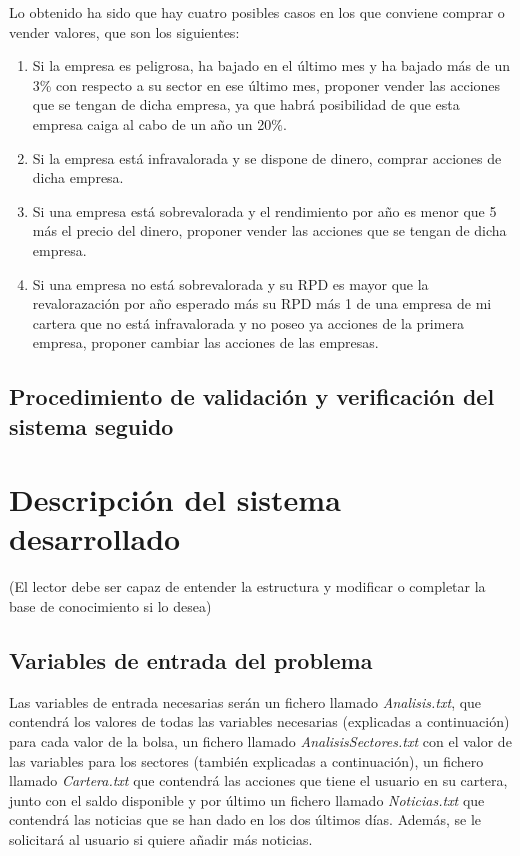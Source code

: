 \documentclass[12pt]{article}
\begin{document}
Lo obtenido ha sido que hay cuatro posibles casos en los que conviene comprar o vender valores, que son los siguientes:
\begin{enumerate}
\item Si la empresa es peligrosa, ha bajado en el último mes y ha bajado más de un 3\% con respecto a su sector en ese último mes, proponer vender las acciones que se tengan de dicha empresa, ya que habrá posibilidad de que esta empresa caiga al cabo de un año un 20\%.
\item Si la empresa está infravalorada y se dispone de dinero, comprar acciones de dicha empresa.
\item Si una empresa está sobrevalorada y el rendimiento por año es menor que 5 más el precio del dinero, proponer vender las acciones que se tengan de dicha empresa.
\item Si una empresa no está sobrevalorada y su RPD es mayor que la revalorazación por año esperado más su RPD más 1 de una empresa de mi cartera que no está infravalorada y no poseo ya acciones de la primera empresa, proponer cambiar las acciones de las empresas.
\end{enumerate}

\subsection{Procedimiento de validación y verificación del sistema seguido}

\section{Descripción del sistema desarrollado}
(El lector debe ser capaz de entender la estructura y modificar o completar la base de conocimiento si lo desea)

\subsection{Variables de entrada del problema}
Las variables de entrada necesarias serán un fichero llamado \textit{Analisis.txt}, que contendrá los valores de todas las variables necesarias (explicadas a continuación) para cada valor de la bolsa, un fichero llamado \textit{AnalisisSectores.txt} con el valor de las variables para los sectores (también explicadas a continuación), un fichero llamado \textit{Cartera.txt} que contendrá las acciones que tiene el usuario en su cartera, junto con el saldo disponible y por último un fichero llamado \textit{Noticias.txt} que contendrá las noticias que se han dado en los dos últimos días. Además, se le solicitará al usuario si quiere añadir más noticias.\\
\end{document}
